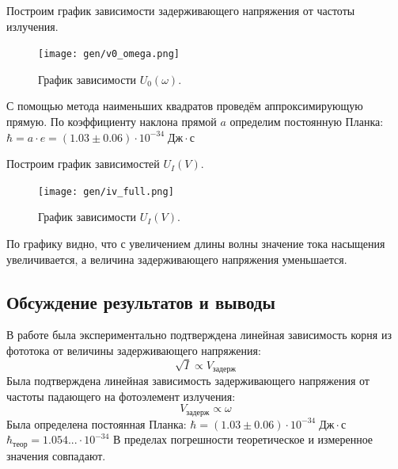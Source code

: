 \documentclass[10pt,a4paper]{article}
\begin{document}
	Построим график зависимости задерживающего напряжения от частоты излучения.			
	\begin{figure}[H]
		\centering
		\texttt{[image: gen/v0\_omega.png]}
		\caption{График зависимости $U_0 (\omega)$.}
	\end{figure}

	С помощью метода наименьших квадратов проведём аппроксимирующую прямую. По коэффициенту наклона прямой $a$ определим постоянную Планка:
	$\hbar = a \cdot e = (1.03 \pm 0.06) \cdot 10^{-34} \; Дж \cdot с$
	
	Построим график зависимостей $U_I(V)$.
			
	\begin{figure}[H]
		\centering
		\texttt{[image: gen/iv\_full.png]}
		\caption{График зависимости $U_I (V)$.}
	\end{figure}
	
	По графику видно, что с увеличением длины волны значение тока насыщения увеличивается, а величина задерживающего напряжения уменьшается.
	
	\subsection*{Обсуждение результатов и выводы}
	
	В работе была экспериментально подтверждена линейная зависимость корня из фототока от величины задерживающего напряжения:
	$$
	\sqrt{I} \propto V_{задерж}
	$$
	Была подтверждена линейная зависимость задерживающего напряжения от частоты падающего на фотоэлемент излучения:
	$$
	V_{задерж} \propto \omega
	$$
	Была определена постоянная Планка:
	$\hbar = (1.03 \pm 0.06) \cdot 10^{-34} \; Дж \cdot с$\\
	$\hbar_{теор} = 1.054...  \cdot 10^{-34}$
	В пределах погрешности теоретическое и измеренное значения совпадают.
	
	
\end{document}
